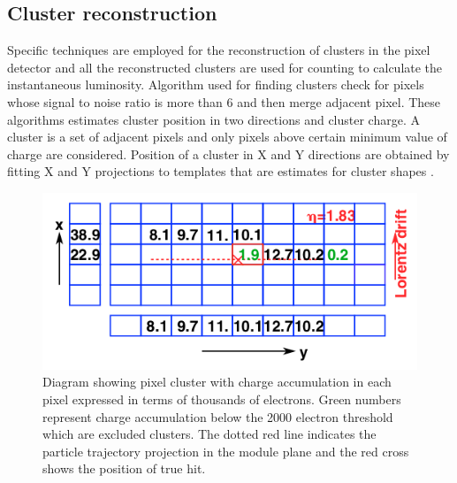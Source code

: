 \subsection{Cluster reconstruction}
Specific techniques are employed for the reconstruction of clusters in the pixel detector and all the reconstructed clusters are used for counting to calculate the instantaneous luminosity. Algorithm used for finding clusters check for pixels whose signal to noise ratio is more than 6 and then merge adjacent pixel. These algorithms estimates cluster position in two directions and cluster charge. A cluster is a set of adjacent pixels and only pixels above certain minimum value of charge are considered. Position of a cluster in X and Y directions are obtained by fitting X and Y projections to templates that are estimates for cluster shapes \cite{Chatrchyan:2014fea}. \\


\begin{figure}[H]
  \centering
  \includegraphics[width=0.6\columnwidth]{./pixel_reco.png}
  \caption{ \onehalfspacing Diagram showing pixel cluster with charge accumulation in each pixel expressed in terms of thousands of electrons. Green numbers represent charge accumulation below the 2000 electron threshold which are excluded clusters. The dotted red line indicates the particle trajectory projection in the module plane and the red cross shows the position of true hit.}
  \label{fig:CMS}
\end{figure}
